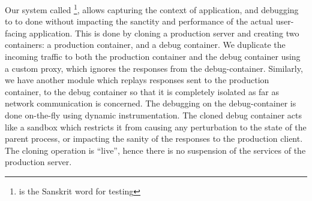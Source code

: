 \noindent
Our system called \parikshan\footnote{\parikshan is the Sanskrit word for testing}, allows capturing the context of application, and debugging to to done without impacting the sanctity and performance of the actual user-facing application. 
This is done by cloning a production server and creating two containers: a production container, and a debug container. 
We duplicate the incoming traffic to both the production container and the debug container using a custom proxy, which ignores the responses from the debug-container.
Similarly, we have another module which replays responses sent to the production container, to the debug container so that it is completely isolated as far as network communication is concerned. 
The debugging on the debug-container is done on-the-fly using dynamic instrumentation. %
The cloned debug container acts like a sandbox which restricts it from causing any perturbation to the state of the parent process, or impacting the sanity of the responses to the production client. 
The cloning operation is ``live'', hence there is no suspension of the services of the production server.

